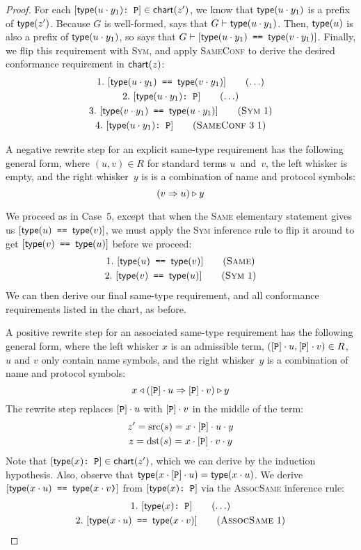 \documentclass[../generics]{subfiles}
\begin{document}
\begin{proof}
For each $[\texttt{$\mathsf{type}(u\cdot y_1)$:~P}]\in\mathsf{chart}(z^\prime)$, we know that $\mathsf{type}(u\cdot y_1)$ is a prefix of $\mathsf{type}(z^\prime)$. Because $G$ is well-formed,  says that $G\vdash\mathsf{type}(u\cdot y_1)$. Then, $\mathsf{type}(u)$ is also a prefix of $\mathsf{type}(u\cdot y_1)$, so  says that $G\vdash[\texttt{$\mathsf{type}(u\cdot y_1)$ == $\mathsf{type}(v\cdot y_1)$}]$. Finally, we flip this requirement with \textsc{Sym}, and apply \textsc{SameConf} to derive the desired conformance requirement in $\mathsf{chart}(z)$:
\begin{gather*}
\AnyStep{\SameReq{$\Type(u\cdot y_1)$}{$\Type(v\cdot y_1)$}}{1}\\
\AnyStep{\ConfReq{$\Type(u\cdot y_1)$}{P}}{2}\\
\SymStep{1}{$\Type(v\cdot y_1)$}{$\Type(u\cdot y_1)$}{3}\\
\SameConfStep{3}{1}{$\Type(u\cdot y_1)$}{P}{4}
\end{gather*}

 A negative rewrite step for an explicit same-type requirement has the following general form, where $(u,v)\in R$ for standard terms $u$~and~$v$, the left whisker is empty, and the right whisker~$y$ is is a combination of name and protocol symbols:
\[(v\Rightarrow u)\triangleright y\]

We proceed as in Case~5, except that when the \textsc{Same} elementary statement gives us $[\texttt{$\mathsf{type}(u)$ == $\mathsf{type}(v)$}]$, we must apply the \textsc{Sym} inference rule to flip it around to get $[\texttt{$\mathsf{type}(v)$ == $\mathsf{type}(u)$}]$ before we proceed:
\begin{gather*}
\SameStep{$\Type(u)$}{$\Type(v)$}{1}\\
\SymStep{1}{$\Type(v)$}{$\Type(u)$}{2}
\end{gather*}
We can then derive our final same-type requirement, and all conformance requirements listed in the chart, as before.

 A positive rewrite step for an associated same-type requirement has the following general form, where the left whisker $x$ is an admissible term, $([\texttt{P}]\cdot u,[\texttt{P}] \cdot v)\in R$, $u$ and $v$ only contain name symbols, and the right whisker~$y$ is a combination of name and protocol symbols:
\[x\triangleleft([\texttt{P}]\cdot u\Rightarrow[\texttt{P}]\cdot v)\triangleright y\]
The rewrite step replaces $[\texttt{P}]\cdot u$ with $[\texttt{P}]\cdot v$ in the middle of the term:
\begin{gather*}
z^\prime=\operatorname{src}(s)=x\cdot[\texttt{P}]\cdot u\cdot y\\
z=\operatorname{dst}(s)=x\cdot[\texttt{P}]\cdot v\cdot y
\end{gather*}
Note that $[\texttt{$\mathsf{type}(x)$:~P}]\in\mathsf{chart}(z^\prime)$, which we can derive by the induction hypothesis. Also, observe that $\mathsf{type}(x\cdot[\texttt{P}]\cdot u)=\mathsf{type}(x\cdot u)$. We derive $[\texttt{$\mathsf{type}(x\cdot u)$ == $\mathsf{type}(x\cdot v$)}]$ from $[\texttt{$\mathsf{type}(x)$:~P}]$ via the \textsc{AssocSame} inference rule:
\begin{gather*}
\AnyStep{\ConfReq{$\Type(x)$}{P}}{1}\\
\AssocSameStep{1}{$\Type(x\cdot u)$}{$\Type(x\cdot v)$}{2}
\end{gather*}


\end{proof}
\end{document}
